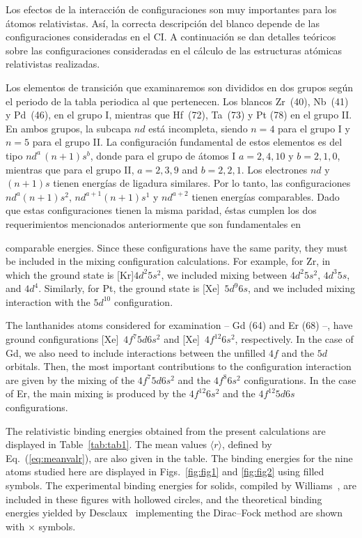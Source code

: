 Los efectos de la interacción de configuraciones son muy importantes 
para los átomos relativistas. Así, la correcta descripción del blanco 
depende de las configuraciones consideradas en el CI. A continuación
se dan detalles teóricos sobre las configuraciones consideradas en el 
cálculo de las estructuras atómicas relativistas realizadas.

Los elementos de transición que examinaremos son divididos en dos grupos
según el periodo de la tabla periodica al que pertenecen. Los blancos 
Zr~(40), Nb~(41) y Pd~(46), en el grupo I, mientras que Hf~(72), 
Ta~(73) y Pt (78) en el grupo II. En ambos grupos, la subcapa $nd$ está
incompleta, siendo $n=4$ para el grupo I y $n=5$ para el grupo II.
La configuración fundamental de estos elementos es del tipo 
$nd^a \,(n+1)s^b$, donde para el grupo de átomos I $a=2,4,10$ y
$b=2,1,0$, mientras que para el grupo II, $a=2,3,9$ and $b=2,2,1$.
Los electrones $nd$ y $(n+1)s$ tienen energías de ligadura similares.
Por lo tanto, las configuraciones $nd^a(n+1)s^2$, $nd^{a+1}(n+1)s^1$ y 
$nd^{a+2}$ tienen energías comparables. Dado que estas configuraciones
tienen la misma paridad, éstas cumplen los dos requerimientos mencionados
anteriormente que son fundamentales en 

comparable energies. Since these configurations have the
same parity, they must be included in the mixing configuration
calculations.
For example, for Zr, in which the ground state is [Kr]$4d^2 5s^2$,
we included mixing between $4d^2 5s^2$, $4d^3 5s$, and
$4d^4$.
Similarly, for Pt, the ground state is [Xe]~$5d^9 6s$, and
we included mixing interaction with the $5d^{10}$ configuration.

The lanthanides atoms considered for examination -- Gd (64) and 
Er (68) --, have
ground configurations [Xe]~$4f^7 5d 6s^2$ and [Xe]~$4f^{12} 6s^2$,
respectively. In the case of Gd, we also need to include interactions
between the unfilled $4f$ and the $5d$ orbitals.
Then, the most important contributions to the configuration interaction
are given by the mixing of the
$4f^7 5d 6s^2$ and the $4f^8 6s^2$ configurations.
In the case of Er, the main mixing is produced by the
$4f^{12} 6s^2$ and the $4f^{12} 5d 6s$ configurations.

The relativistic binding energies obtained from the present 
calculations are displayed in Table~\ref{tab:tab1}.
The mean values $\langle r \rangle$, defined by Eq.~(\ref{eq:meanvalr}),
are also given in the table.
The binding energies for the nine atoms studied here are displayed
in Figs.~\ref{fig:fig1} and \ref{fig:fig2} using filled symbols.
The experimental binding energies for solids, compiled by
Williams~\cite{expdata}, are included in these figures with hollowed
circles, and the theoretical binding energies yielded by
Desclaux~\cite{Desclaux:73} implementing the Dirac--Fock method are
shown with $\times$ symbols.

